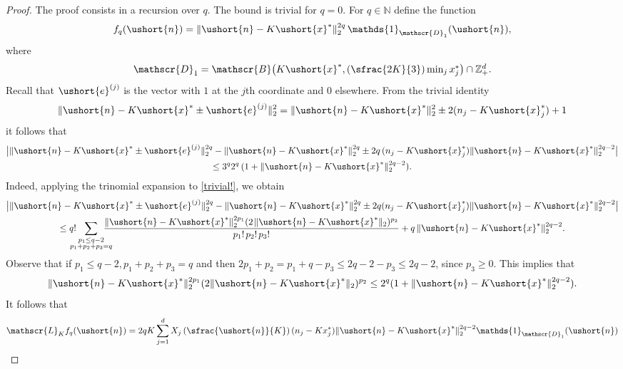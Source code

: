 \documentclass[JEP,XML,SOM,Unicode]{cedram}
\newcommand{\Psfrac}[2]{(\sfrac{#1}{#2})}
\newcommand{\scaleto}[2]{#1}
\let\ts\textstyle
\let\mathcal\mathscr
\numberwithin{equation}{section}
\theoremstyle{plain}
\theoremstyle{definition}
\newcommand{\zentiers}{{\mathbb{Z}}}
\newcommand{\integers}{\mathbb{N}}
\newcommand{\domaine}{\zentiers_{+}^{d}}
\newcommand{\sK}{K}
\newcommand{\gen}{\mathscr{L}_{\sK}}
\newcommand{\un}{\mathds{1}}
\newcommand{\vecn}{\ushort{n}}
\newcommand{\vecxf}{\ushort{x}^*}
\newcommand{\vece}[1]{\ushort{e}^{(#1)}}
\begin{document}
\begin{proof} The proof consists in a recursion over $q$. The bound is trivial for $q=0$.
For $q\in\integers$ define the function
\[
f_q(\vecn)=\|\vecn-K\vecxf\|_{2}^{\scaleto{2q}{5.5pt}} \,\un_{\mathcal{D}_1}(\vecn),
\]
where
\begin{equation*}
\mathcal{D}_1 = \mathcal{B} \bigl(\scaleto{K}{7.5pt}\vecxf, \scaleto{\Psfrac{2K}{3}}{18pt}\ts\min_{j}x^*_{j}\bigr)\cap \domaine.
\end{equation*}
Recall that $\vece{j}$ is the vector with $1$ at the $j$th coordinate and $0$ elsewhere. From the trivial identity
\begin{equation}
\label{trivial!}
\|\vecn - K\vecxf \pm \vece{j}\|_{2}^2 = \|\vecn - K\vecxf\|_{2}^2 \pm 2(n_j -K\vecxf_{j})+1
\end{equation}
it follows that
\begin{multline*}
\big|\|\vecn - K\vecxf \pm \vece{j}\|_{2}^{\scaleto{2q}{5.3pt}} -
\|\vecn - K\vecxf\|_{2}^{\scaleto{2q}{5.3pt}} \pm 2q\, (n_j -K\vecxf_{j})\|\vecn - K\vecxf\|_{2}^{\scaleto{2q-2}{5.3pt}}\big|\\
\leq 3^q 2^q \,(1+\|\vecn - K\vecxf\|_{2}^{\scaleto{2q-2}{5.3pt}}).
\end{multline*}
Indeed, applying the trinomial expansion to \eqref{trivial!}, we obtain
\begin{multline*}
\big|\|\vecn - K\vecxf \pm \vece{j}\|_{2}^{\scaleto{2q}{5.3pt}} -
\|\vecn - K\vecxf\|_{2}^{\scaleto{2q}{5.3pt}} \pm 2q (n_j -K\vecxf_{j})\|\vecn - K\vecxf\|_{2}^{\scaleto{2q-2}{5.3pt}}\big|\\
\leq
q! \hspace*{-3mm}\sum_{\substack{p_{1}\leq q-2\\ p_{1}+p_{2}+p_{3} = q}}\hspace*{-4mm}
\frac{\|\vecn - K\vecxf\|_{2}^{\scaleto{2p_{1}}{5.3pt}} (2\hspace{1pt} \|\vecn - K\vecxf\|_{2})^{p_{2}} }{p_{1}! \, p_{2}! \, p_{3}!}
+ q\, \|\vecn - K\vecxf\|_{2}^{\scaleto{2q-2}{5.3pt}}.
\end{multline*}
Observe that if $p_{1}\leq q-2, p_{1}+p_{2}+p_{3} = q$ and then
$2p_{1}+p_{2} =p_{1}+q-p_{3}\leq 2q -2 -p_{3}\leq 2q-2$, since $p_{3}\geq 0$. This implies that
\[
\|\vecn - K\vecxf\|_{2}^{\scaleto{2p_{1}}{5.3pt}} (2 \|\vecn - K\vecxf\|_{2})^{\scaleto{p_{2}}{4pt}}
\leq 2^q(1+\|\vecn - K\vecxf\|_{2}^{\scaleto{2q-2}{5.3pt}}).
\]
It follows that
\begin{equation}\label{genfq}
\gen f_q(\vecn)=
2q K \sum_{j=1}^d X_j\left(\sfrac{\vecn}{K}\right) (n_j-Kx_j^*) \|\vecn - K\vecxf\|_{2}^{\scaleto{2q-2}{5.3pt}} \un_{\mathcal{D}_1}(\vecn)

\end{equation}
\end{proof}
\end{document}
